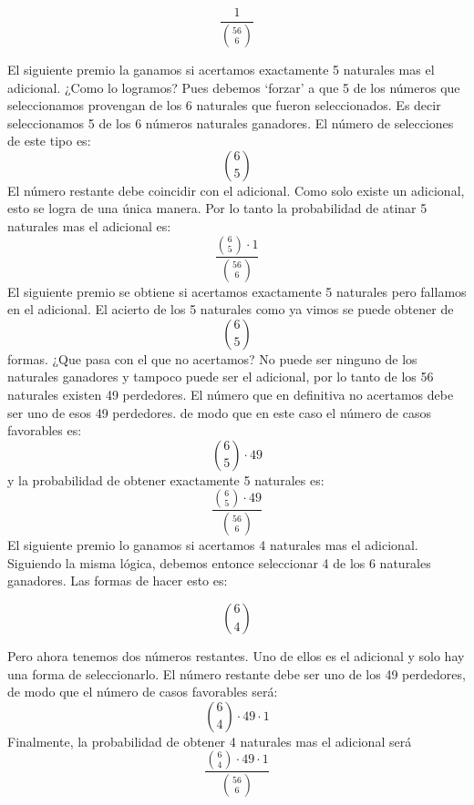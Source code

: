 \documentclass[14pt]{extreport}
\theoremstyle{definicion}
\theoremstyle{propiedad}
\begin{document}
$$
\frac{1}{\binom{56}{6}}
$$

El siguiente premio la ganamos si acertamos exactamente 5 naturales mas el adicional. ¿Como lo logramos? Pues debemos `forzar' a que 5 de los números que seleccionamos provengan de los 6 naturales que fueron seleccionados. Es decir seleccionamos 5 de los 6 números naturales ganadores. El número de selecciones de este tipo es: 
$$
\binom{6}{5} 
$$
El número restante debe coincidir con el adicional. Como solo existe un adicional, esto se logra de una única manera. Por lo tanto la probabilidad de atinar 5 naturales mas el adicional es: 
$$
\frac{\binom{6}{5} \cdot 1}{\binom{56}{6}}
$$
El siguiente premio se obtiene si acertamos exactamente 5 naturales pero fallamos en el adicional. El acierto de los 5 naturales como ya vimos se puede obtener de
$$
\binom{6}{5}
$$ 
formas. ¿Que pasa con el que no acertamos? No puede ser ninguno de los naturales ganadores y tampoco puede ser el adicional, por lo tanto de los 56 naturales existen 49 perdedores. El número que en definitiva no acertamos debe ser uno de esos 49 perdedores. de modo que en este caso el número de casos favorables es: 
$$
\binom{6}{5}\cdot 49
$$
y la probabilidad de obtener exactamente 5 naturales es:
$$
\frac{\binom{6}{5}\cdot 49}{\binom{56}{6}}
$$
El siguiente premio lo ganamos si acertamos 4 naturales mas el adicional. Siguiendo la misma lógica, debemos entonce seleccionar 4 de los 6 naturales ganadores. Las formas de hacer esto es: 

$$
\binom{6}{4}
$$

Pero ahora tenemos dos números restantes. Uno de ellos es el adicional y solo hay una forma de seleccionarlo. El número restante debe ser uno de los 49 perdedores, de modo que el número de casos favorables será: 
$$
\binom{6}{4}\cdot 49 \cdot 1
$$
Finalmente, la probabilidad de obtener 4 naturales mas el adicional será
$$
\frac{\binom{6}{4}\cdot 49 \cdot 1}{\binom{56}{6}}
$$
\end{document}
